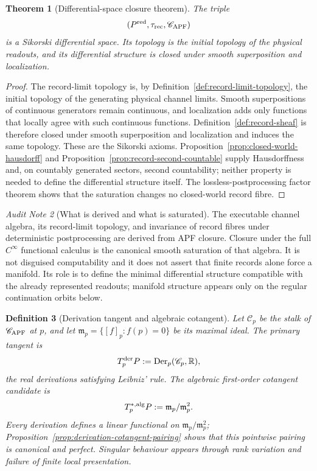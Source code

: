 \documentclass[11pt]{article}
\newtheorem{theorem}{Theorem}[section]
\newtheorem{definition}[theorem]{Definition}
\theoremstyle{remark}
\newtheorem{audit}[theorem]{Audit Note}
\begin{document}
\begin{theorem}[Differential-space closure theorem]
\label{thm:apf-cinfty-closure}
The triple
\[
(P^{\rm red},\tau_{\rm rec},\mathscr C_{\rm APF})
\]
is a Sikorski differential space.  Its topology is the initial topology of the
physical readouts, and its differential structure is closed under smooth
superposition and localization.
\end{theorem}

\begin{proof}
The record-limit topology is, by Definition~\ref{def:record-limit-topology},
the initial topology of the generating physical channel limits.  Smooth
superpositions of continuous generators remain continuous, and localization
adds only functions that locally agree with such continuous functions.
Definition~\ref{def:record-sheaf} is therefore closed under smooth
superposition and localization and induces the same topology.  These are the
Sikorski axioms.  Proposition~\ref{prop:closed-world-hausdorff} and
Proposition~\ref{prop:record-second-countable} supply Hausdorffness and, on
countably generated sectors, second countability; neither property is needed
to define the differential structure itself.  The lossless-postprocessing
factor theorem shows that the saturation changes no closed-world record fibre.
\end{proof}

\begin{audit}[What is derived and what is saturated]
The executable channel algebra, its record-limit topology, and invariance of
record fibres under deterministic postprocessing are derived from APF closure.
Closure under the full $C^\infty$ functional calculus is the canonical smooth
saturation of that algebra.  It is not disguised computability and it does not
assert that finite records alone force a manifold.  Its role is to define the
minimal differential structure compatible with the already represented
readouts; manifold structure appears only on the regular continuation orbits
below.
\end{audit}

\begin{definition}[Derivation tangent and algebraic cotangent]
\label{def:derivation-tangent}
Let $\mathscr C_p$ be the stalk of $\mathscr C_{\rm APF}$ at $p$, and let
$\mathfrak m_p=\{[f]_p:f(p)=0\}$ be its maximal ideal.  The primary tangent is
\[
        T_p^{\rm der}P
        :=\operatorname{Der}_p(\mathscr C_p,\mathbb R),
\]
the real derivations satisfying Leibniz' rule.  The algebraic first-order
cotangent candidate is
\[
        T^{*,\rm alg}_pP:=\mathfrak m_p/\mathfrak m_p^2.
\]
Every derivation defines a linear functional on
$\mathfrak m_p/\mathfrak m_p^2$; Proposition~\ref{prop:derivation-cotangent-pairing}
shows that this pointwise pairing is canonical and perfect.  Singular behaviour
appears through rank variation and failure of finite local presentation.
\end{definition}
\end{document}
